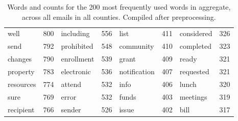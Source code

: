 \documentclass{pnastwo}
\begin{document}
\begin{article}
\begin{table}[ht]
\begin{tabular}{lr|lr|lr|lr}
   well &  800 & including & 556 & list & 411 & considered & 326 \\ 
   send &  792 & prohibited & 548 & community & 410 & completed & 323 \\ 
   changes &  790 & enrollment & 539 & grant & 409 & ready & 321 \\ 
   property &  783 & electronic & 536 & notification & 407 & requested & 321 \\ 
   resources &  774 & attend & 532 & info & 406 & lunch & 320 \\ 
   sure &  769 & error & 532 & funds & 403 & meetings & 319 \\ 
   recipient &  766 & \cellcolor{lred} sender & 526 & issue & 402 & bill & 317 \\ 
   \bottomrule
\end{tabular}
\caption{\label{tab: top words} Words and counts for the 200 most frequently used words in aggregate, across all emails in all counties. Compiled after preprocessing.}
\end{table}



\end{article}
\end{document}
